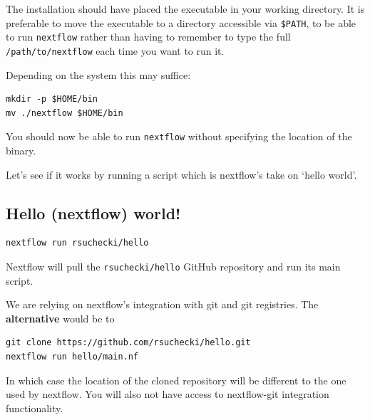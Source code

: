The installation should have placed the executable in your working directory.
It is preferable to move the executable to a directory accessible via \texttt{\$PATH}, 
to be able to run \texttt{nextflow} rather than having to remember 
to type the full \texttt{/path/to/nextflow} each time you want to run it.

Depending on the system this may suffice:

\begin{steps}
\begin{lstlisting}
mkdir -p $HOME/bin
mv ./nextflow $HOME/bin
\end{lstlisting}
\end{steps}

You should now be able to run \texttt{nextflow} without specifying the location of the binary.

Let's see if it works by running a script which is nextflow's take on `hello world'.

\subsection{Hello (nextflow) world!}

\begin{steps}
\begin{lstlisting}
nextflow run rsuchecki/hello
\end{lstlisting}
\end{steps}

Nextflow will pull the \texttt{rsuchecki/hello} GitHub repository and run its main script.\\

\begin{note}
We are relying on nextflow's integration with git and git registries. 
The \textbf{alternative} would be to
\begin{verbatim}
git clone https://github.com/rsuchecki/hello.git
nextflow run hello/main.nf
\end{verbatim}
In which case the location of the cloned repository will be different to the one used by nextflow.
You will also not have access to nextflow-git integration functionality. 
\end{note}

